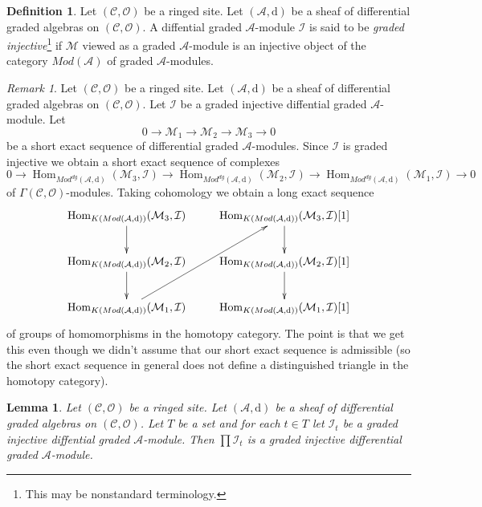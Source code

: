 \documentclass{stacks-project}
\theoremstyle{plain}
\newtheorem{lemma}[subsection]{Lemma}
\theoremstyle{definition}
\newtheorem{definition}[subsection]{Definition}
\theoremstyle{remark}
\newtheorem{remark}[subsection]{Remark}
\numberwithin{equation}{subsection}
\def\Hom{\mathop{\mathrm{Hom}}\nolimits}
\begin{document}
\begin{definition}
\label{definition-graded-injective}
Let $(\mathcal{C}, \mathcal{O})$ be a ringed site.
Let $(\mathcal{A}, \text{d})$ be a sheaf of differential graded algebras
on $(\mathcal{C}, \mathcal{O})$. A diffential graded $\mathcal{A}$-module
$\mathcal{I}$ is said to be {\it graded injective}\footnote{This may be
nonstandard terminology.} if $\mathcal{M}$ viewed as a graded
$\mathcal{A}$-module is an injective object of the category
$\textit{Mod}(\mathcal{A})$ of graded $\mathcal{A}$-modules.
\end{definition}

\begin{remark}
\label{remark-why-graded-injective}
Let $(\mathcal{C}, \mathcal{O})$ be a ringed site.
Let $(\mathcal{A}, \text{d})$ be a sheaf of differential graded algebras
on $(\mathcal{C}, \mathcal{O})$. Let $\mathcal{I}$ be a graded injective
diffential graded $\mathcal{A}$-module. Let
$$
0 \to \mathcal{M}_1 \to \mathcal{M}_2 \to \mathcal{M}_3 \to 0
$$
be a short exact sequence of differential graded $\mathcal{A}$-modules.
Since $\mathcal{I}$ is graded injective
we obtain a short exact sequence of complexes
$$
0 \to
\Hom_{\textit{Mod}^{dg}(\mathcal{A}, \text{d})}(\mathcal{M}_3, \mathcal{I})
\to
\Hom_{\textit{Mod}^{dg}(\mathcal{A}, \text{d})}(\mathcal{M}_2, \mathcal{I})
\to
\Hom_{\textit{Mod}^{dg}(\mathcal{A}, \text{d})}(\mathcal{M}_1, \mathcal{I})
\to 0
$$
of $\Gamma(\mathcal{C}, \mathcal{O})$-modules. Taking cohomology we
obtain a long exact sequence
$$
\xymatrix{
\Hom_{K(\textit{Mod}(\mathcal{A}, \text{d}))}(\mathcal{M}_3, \mathcal{I})
\ar[d] &
\Hom_{K(\textit{Mod}(\mathcal{A}, \text{d}))}(\mathcal{M}_3, \mathcal{I})[1]
\ar[d] \\
\Hom_{K(\textit{Mod}(\mathcal{A}, \text{d}))}(\mathcal{M}_2, \mathcal{I})
\ar[d] &
\Hom_{K(\textit{Mod}(\mathcal{A}, \text{d}))}(\mathcal{M}_2, \mathcal{I})[1]
\ar[d] \\
\Hom_{K(\textit{Mod}(\mathcal{A}, \text{d}))}(\mathcal{M}_1, \mathcal{I})
\ar[ruu]
&
\Hom_{K(\textit{Mod}(\mathcal{A}, \text{d}))}(\mathcal{M}_1, \mathcal{I})[1]
}
$$
of groups of homomorphisms in the homotopy category. The point is that
we get this even though we didn't assume that our short exact sequence
is admissible (so the short exact sequence in general does not define
a distinguished triangle in the homotopy category).
\end{remark}

\begin{lemma}
\label{lemma-product-graded-injective}
Let $(\mathcal{C}, \mathcal{O})$ be a ringed site.
Let $(\mathcal{A}, \text{d})$ be a sheaf of differential graded algebras
on $(\mathcal{C}, \mathcal{O})$. Let $T$ be a set and for
each $t \in T$ let $\mathcal{I}_t$ be a graded injective
diffential graded $\mathcal{A}$-module. Then
$\prod \mathcal{I}_t$ is a graded injective differential
graded $\mathcal{A}$-module.
\end{lemma}
\end{document}
